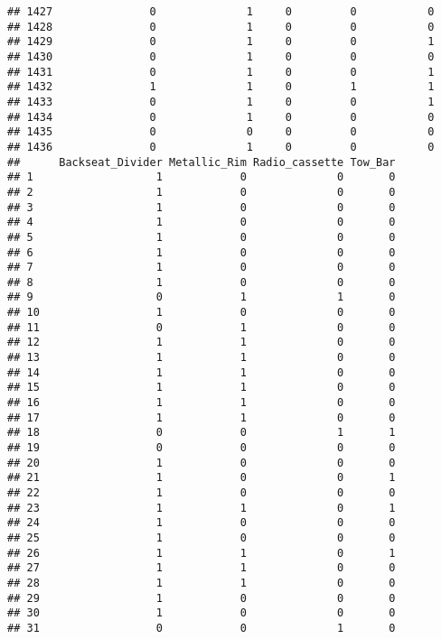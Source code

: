 \documentclass[]{article}
\begin{document}
\begin{verbatim}
## 1427               0              1     0         0           0
## 1428               0              1     0         0           0
## 1429               0              1     0         0           1
## 1430               0              1     0         0           0
## 1431               0              1     0         0           1
## 1432               1              1     0         1           1
## 1433               0              1     0         0           1
## 1434               0              1     0         0           0
## 1435               0              0     0         0           0
## 1436               0              1     0         0           0
##      Backseat_Divider Metallic_Rim Radio_cassette Tow_Bar
## 1                   1            0              0       0
## 2                   1            0              0       0
## 3                   1            0              0       0
## 4                   1            0              0       0
## 5                   1            0              0       0
## 6                   1            0              0       0
## 7                   1            0              0       0
## 8                   1            0              0       0
## 9                   0            1              1       0
## 10                  1            0              0       0
## 11                  0            1              0       0
## 12                  1            1              0       0
## 13                  1            1              0       0
## 14                  1            1              0       0
## 15                  1            1              0       0
## 16                  1            1              0       0
## 17                  1            1              0       0
## 18                  0            0              1       1
## 19                  0            0              0       0
## 20                  1            0              0       0
## 21                  1            0              0       1
## 22                  1            0              0       0
## 23                  1            1              0       1
## 24                  1            0              0       0
## 25                  1            0              0       0
## 26                  1            1              0       1
## 27                  1            1              0       0
## 28                  1            1              0       0
## 29                  1            0              0       0
## 30                  1            0              0       0
## 31                  0            0              1       0

\end{verbatim}
\end{document}

